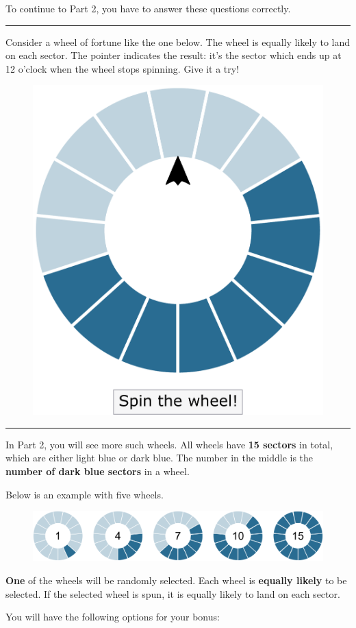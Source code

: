 \documentclass[pdftex,12pt, a4paper]{article}
\begin{document}
\noindent To continue to Part 2, you have to answer these questions correctly.

\bigskip
\noindent \rule{\linewidth}{0.4pt}

\noindent Consider a wheel of fortune like the one below.\label{explanation}
The wheel is equally likely to land on each sector.
The pointer indicates the result: it's the sector which ends up at 12 o'clock when the wheel stops spinning.
Give it a try!

\begin{figure}[h!]
	\centering
	{\includegraphics[width=0.4\linewidth]{Fig3_SpinMe.pdf}}
\end{figure}

\bigskip
\noindent \rule{\linewidth}{0.4pt}

\noindent In Part 2, you will see more such wheels. All wheels have \textbf{15 sectors} in total, which are either light blue or dark blue.
The number in the middle is the \textbf{number of dark blue sectors} in a wheel.
 
\noindent Below is an example with five wheels.

\begin{figure}[h!]
	\centering
	{\includegraphics[width=\linewidth]{Fig4_Explaining_MAP.pdf}}
\end{figure}

\noindent \textbf{One} of the wheels will be randomly selected. Each wheel is \textbf{equally likely} to be selected. If the selected wheel is spun, it is {equally likely to land on each sector}.

\noindent You will have the following options for your bonus:
\end{document}
